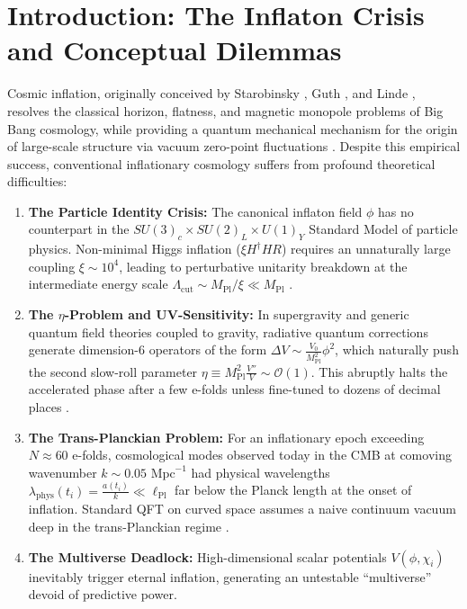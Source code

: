 \documentclass[11pt,a4paper]{article}
\begin{document}
\section{Introduction: The Inflaton Crisis and Conceptual Dilemmas}
Cosmic inflation, originally conceived by Starobinsky \cite{Starobinsky1980}, Guth \cite{Guth1981}, and Linde \cite{Linde1982}, resolves the classical horizon, flatness, and magnetic monopole problems of Big Bang cosmology, while providing a quantum mechanical mechanism for the origin of large-scale structure via vacuum zero-point fluctuations \cite{Mukhanov1981}. Despite this empirical success, conventional inflationary cosmology suffers from profound theoretical difficulties:
\begin{enumerate}
    \item \textbf{The Particle Identity Crisis:} The canonical inflaton field $\phi$ has no counterpart in the $SU(3)_c \times SU(2)_L \times U(1)_Y$ Standard Model of particle physics. Non-minimal Higgs inflation ($\xi H^\dagger H R$) requires an unnaturally large coupling $\xi \sim 10^4$, leading to perturbative unitarity breakdown at the intermediate energy scale $\Lambda_{\mathrm{cut}} \sim M_{\mathrm{Pl}}/\xi \ll M_{\mathrm{Pl}}$ \cite{Burgess2009}.
    \item \textbf{The $\eta$-Problem and UV-Sensitivity:} In supergravity and generic quantum field theories coupled to gravity, radiative quantum corrections generate dimension-6 operators of the form $\Delta V \sim \frac{V_0}{M_{\mathrm{Pl}}^2} \phi^2$, which naturally push the second slow-roll parameter $\eta \equiv M_{\mathrm{Pl}}^2 \frac{V''}{V} \sim \mathcal{O}(1)$. This abruptly halts the accelerated phase after a few e-folds unless fine-tuned to dozens of decimal places \cite{Baumann2009}.
    \item \textbf{The Trans-Planckian Problem:} For an inflationary epoch exceeding $N \approx 60$ e-folds, cosmological modes observed today in the CMB at comoving wavenumber $k \sim 0.05\text{ Mpc}^{-1}$ had physical wavelengths $\lambda_{\mathrm{phys}}(t_i) = \frac{a(t_i)}{k} \ll \ell_{\mathrm{Pl}}$ far below the Planck length at the onset of inflation. Standard QFT on curved space assumes a naive continuum vacuum deep in the trans-Planckian regime \cite{Martin2001}.
    \item \textbf{The Multiverse Deadlock:} High-dimensional scalar potentials $V(\phi, \chi_i)$ inevitably trigger eternal inflation, generating an untestable ``multiverse'' devoid of predictive power.
\end{enumerate}
\end{document}

